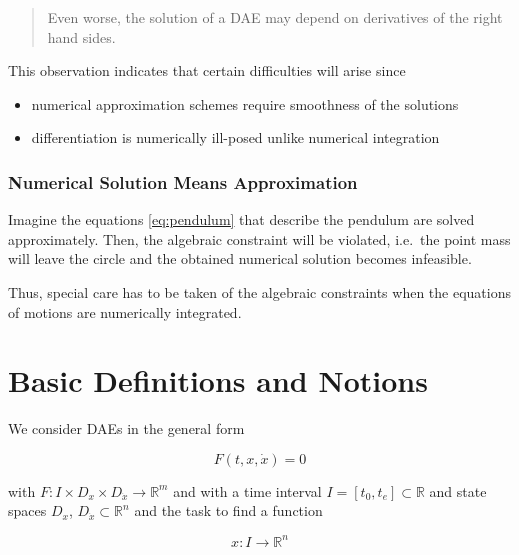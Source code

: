 \documentclass[]{book}
\providecommand{\tightlist}{%
  \setlength{\itemsep}{0pt}\setlength{\parskip}{0pt}}
\newenvironment {JHSAYS} [0] {\begin{quote}} {\end{quote}}
\theoremstyle{definition}
\theoremstyle{definition}
\theoremstyle{definition}
\theoremstyle{remark}
\begin{document}
\begin{JHSAYS}
Even worse, the solution of a DAE may depend on derivatives of the right
hand sides.
\end{JHSAYS}

This observation indicates that certain difficulties will arise since

\begin{itemize}
\tightlist
\item
  numerical approximation schemes require smoothness of the solutions
\item
  differentiation is numerically ill-posed unlike numerical integration
\end{itemize}

\hypertarget{numerical-solution-means-approximation}{%
\subsection*{Numerical Solution Means Approximation}\label{numerical-solution-means-approximation}}

Imagine the equations \eqref{eq:pendulum} that describe the pendulum are solved approximately. Then, the algebraic constraint will be violated, i.e.~the point mass will leave the circle and the obtained numerical solution becomes infeasible.

Thus, special care has to be taken of the algebraic constraints when the equations of motions are numerically integrated.

\hypertarget{basic-definitions-and-notions}{%
\chapter{Basic Definitions and Notions}\label{basic-definitions-and-notions}}

We consider DAEs in the general form

\begin{equation}
    F(t, x, \dot x) = 0
    \label{eq:gendae}
\end{equation}

with \(F\colon I \times D_x \times D_{\dot x} \to \mathbb R^m\) and with a time interval \(I=[t_0,t_e] \subset \mathbb R\) and state spaces \(D_x\), \(D_{\dot x} \subset \mathbb R^{n}\) and the task to find a function

\begin{equation*}
    x \colon I \to \mathbb R^{n}
\end{equation*}
\end{document}
